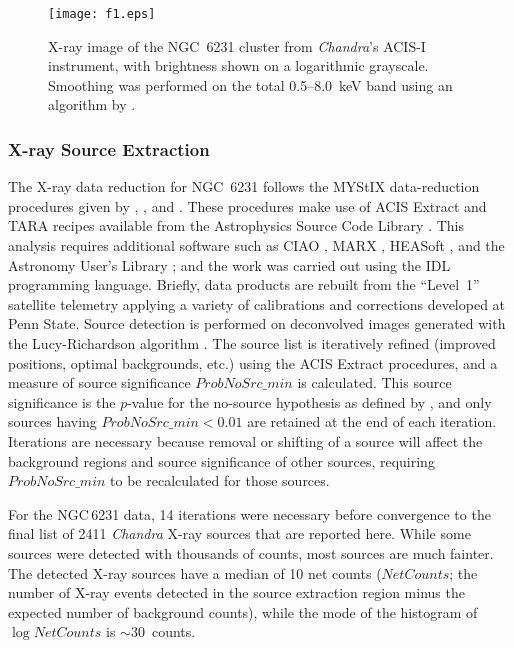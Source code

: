 \documentclass[twocolumn,tighten]{aastex61}
\begin{document}
\begin{figure*}[h]
\centering
\texttt{[image: f1.eps]} 
\caption{X-ray image of the NGC~6231 cluster from {\it Chandra}'s ACIS-I instrument, with brightness shown on a logarithmic grayscale. Smoothing was performed on the total 0.5--8.0~keV band using an algorithm by \citet{2006MNRAS.368...65E}.\label{ximg.fig}}
\end{figure*}

\subsubsection{X-ray Source Extraction}
The X-ray data reduction for NGC~6231 follows the MYStIX data-reduction procedures given by \citet{2010ApJ...714.1582B}, \citet{2014ApJS..213....1T}, and \citet{2013ApJS..209...27K}. 
These procedures make use of ACIS Extract and TARA recipes available from the Astrophysics Source Code Library \citep{2012ascl.soft03001B}. This analysis requires additional software such as CIAO \citep{2006SPIE.6270E..1VF}, MARX \citep{2012SPIE.8443E..1AD}, HEASoft \citep{2014ascl.soft08004N}, and the Astronomy User's Library \citep[AstroLib;][]{1993ASPC...52..246L}; and the work was carried out using the IDL programming language. Briefly, data products are rebuilt from the ``Level~1'' satellite telemetry applying a variety of calibrations and corrections developed at Penn State. Source detection is performed on deconvolved images generated with the Lucy-Richardson algorithm \citep{1974AJ.....79..745L}. The source list is iteratively refined (improved positions, optimal backgrounds, etc.) using the ACIS Extract procedures, and a measure of source significance $ProbNoSrc\_min$ is calculated. This source significance is the $p$-value for the no-source hypothesis as defined by \citet[][\S4.3]{2010ApJ...714.1582B}, and only sources having $ProbNoSrc\_min<0.01$ are retained at the end of each iteration. Iterations are necessary because removal or shifting of a source will affect the background regions and source significance of other sources, requiring $ProbNoSrc\_min$ to be recalculated for those sources.

For the NGC\,6231 data, 14 iterations were necessary before convergence to the final list of 2411 {\it Chandra} X-ray sources that are reported here. While some sources were detected with thousands of counts, most sources are much fainter. The detected X-ray sources have a median of 10 net counts ($NetCounts$; the number of X-ray events detected in the source extraction region minus the expected number of background counts), while the mode of the histogram of $\log NetCounts$ is $\sim$30~counts.
\end{document}
